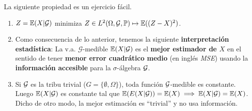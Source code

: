 La siguiente propiedad es un ejercicio fácil.
\begin{property}
\beforeitemize
\begin{enumerate}
    \item $Z=\mathbb{E}(X|\mathcal{G})$ minimiza $Z\in L^2(\Omega,\mathcal{G},\mathbb{P})\mapsto\mathbb{E}((Z-X)^2)$.
    \item Como consecuencia de lo anterior, tenemos la siguiente \textbf{interpretación estadística}: La v.a. $\mathcal{G}$-medible $\mathbb{E}(X|\mathcal{G})$ es el \textbf{mejor estimador de $X$} en el sentido de tener \textbf{menor error cuadrático medio} (en inglés \textit{MSE}) usando la \textbf{información accesible} para la $\sigma$-álgebra $\mathcal{G}$.
    \item Si $\mathcal{G}$ es la tribu trivial ($G=\{\emptyset,\Omega\}$), toda función $\mathcal{G}$-medible es constante. Luego $\mathbb{E}(X|\mathcal{G})$ es constante tal que $\mathbb{E}(E(X|\mathcal{G}))=\mathbb{E}(X)\implies\mathbb{E}(X|\mathcal{G})=\mathbb{E}(X)$. \\ Dicho de otro modo, la mejor estimación es ``trivial'' y no usa información.
\end{enumerate}
\end{property}

